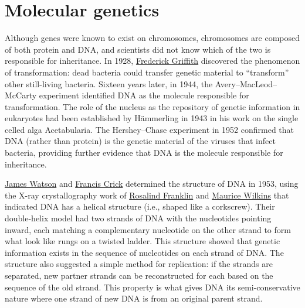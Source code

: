\hypertarget{molecular-genetics}{%
\section{Molecular genetics}\label{molecular-genetics}}

Although genes were known to exist on chromosomes, chromosomes are composed of both protein and DNA, and scientists did not know which of the two is responsible for inheritance. In 1928, \href{https://en.wikipedia.org/wiki/Frederick_Griffith}{Frederick Griffith} discovered the phenomenon of transformation: dead bacteria could transfer genetic material to ``transform'' other still-living bacteria. Sixteen years later, in 1944, the Avery--MacLeod--McCarty experiment identified DNA as the molecule responsible for transformation. The role of the nucleus as the repository of genetic information in eukaryotes had been established by Hämmerling in 1943 in his work on the single celled alga Acetabularia. The Hershey--Chase experiment in 1952 confirmed that DNA (rather than protein) is the genetic material of the viruses that infect bacteria, providing further evidence that DNA is the molecule responsible for inheritance.

\href{https://en.wikipedia.org/wiki/James_Watson}{James Watson} and \href{https://en.wikipedia.org/wiki/Francis_Crick}{Francis Crick} determined the structure of DNA in 1953, using the X-ray crystallography work of \href{https://en.wikipedia.org/wiki/Rosalind_Franklin}{Rosalind Franklin} and \href{https://en.wikipedia.org/wiki/Maurice_Wilkins}{Maurice Wilkins} that indicated DNA has a helical structure (i.e., shaped like a corkscrew). Their double-helix model had two strands of DNA with the nucleotides pointing inward, each matching a complementary nucleotide on the other strand to form what look like rungs on a twisted ladder. This structure showed that genetic information exists in the sequence of nucleotides on each strand of DNA. The structure also suggested a simple method for replication: if the strands are separated, new partner strands can be reconstructed for each based on the sequence of the old strand. This property is what gives DNA its semi-conservative nature where one strand of new DNA is from an original parent strand.




